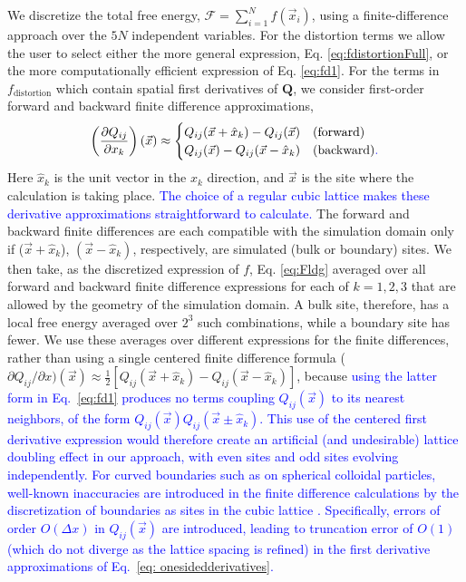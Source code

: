 \documentclass[utf8]{frontiersFPHY} %
\newcommand{\DAB}[1]{\textcolor{blue}{#1}}
\newcommand{\Q}{\mathbf{Q}}
\begin{document}
We discretize the total free energy, $\mathcal{F} = \sum_{i=1}^N f(\vec{x}_i)$, using a finite-difference approach over the $5N$ independent variables. For the distortion terms we allow the user to select either the more general expression, Eq. \ref{eq:fdistortionFull}, or the more computationally efficient expression of Eq. \ref{eq:fd1}. For the terms in $f_{\mathrm{distortion}}$ which contain spatial first derivatives of $\Q$, we consider first-order forward and backward finite difference approximations,
\begin{equation}
\left(\frac{\partial Q_{ij} }{\partial x_k}\right)(\vec{x}) \approx  \begin{cases}  Q_{ij} (\vec{x} + \hat x_k ) - Q_{ij} (\vec {x}) & \text{(forward})  \\ Q_{ij}(\vec{x}) - Q_{ij} (\vec{x} - \hat x_k) & \text{(backward)\DAB{.}} \end{cases} \label{eq: onesidedderivatives}
\end{equation}
Here $\hat x_k$ is the unit vector in the $x_k$ direction, and $\vec{x}$ is the site where the calculation is taking place. \DAB{The choice of a regular cubic lattice makes these derivative approximations straightforward to calculate.} The forward and backward finite differences are each compatible with the simulation domain only if ($\vec{x} + \hat x_k$), $(\vec{x} - \hat x_k)$, respectively, are simulated (bulk or boundary) sites. We then take, as the discretized expression of $f$, Eq. \ref{eq:Fldg} averaged over all forward and backward finite difference expressions for each of $k=1,2,3$ that are allowed by the geometry of the simulation domain. A bulk site, therefore, has a local free energy averaged over $2^3$ such combinations, while a boundary site has fewer. We use these averages over different expressions for the finite differences, rather than using a single centered finite difference formula ($\partial Q_{ij} /\partial x)(\vec{x}) \approx \tfrac{1}{2} [Q_{ij}(\vec{x}+\hat x_k) - Q_{ij}(\vec{x} - \hat x_k)]$, because \DAB{using the latter form in Eq.~\ref{eq:fd1} produces no terms coupling $Q_{ij}(\vec{x})$ to its nearest neighbors, of the form $Q_{ij}(\vec{x}) Q_{ij}(\vec{x} \pm \hat x_k)$. This use of the centered first derivative expression would therefore create an artificial (and undesirable) lattice doubling effect in our approach, with even sites and odd sites evolving independently. For curved boundaries such as on spherical colloidal particles, well-known inaccuracies are introduced in the finite difference calculations by the discretization of boundaries as sites in the cubic lattice \cite{noye1990accurate}. Specifically, errors of order $O(\Delta x)$ in $Q_{ij}(\vec{x})$ are introduced, leading to truncation error of $O(1)$ (which do not diverge as the lattice spacing is refined) in the first derivative approximations of Eq.~\ref{eq: onesidedderivatives}. }
\end{document}
